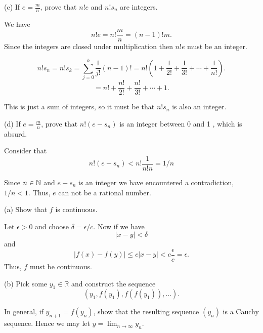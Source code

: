 \documentclass{report}
\begin{document}
\bigskip

(c) If $e=\frac{m}{n}$, prove that $n ! e$ and $n ! s_n$ are integers.

\begin{myproof}

We have $$ n!e = n!\frac{m}{n} = (n-1)!m.$$ Since the integers are closed under multiplication then $n!e$ must be an integer. 
    
\end{myproof}

\begin{myproof}

$$ n!s_n = n!s_k=\sum_{j=0}^k \frac{1}{j !}(n-1)! = n!\left(1 + \frac{1}{2!} + \frac{1}{3!}+ \cdots +\frac{1}{n!}\right) .$$
$$ = n! + \frac{n!}{2!} + \frac{n!}{3!}+ \cdots + 1 .$$

This is just a sum of integers, so it must be that $n!s_n$ is also an integer.
\end{myproof}

\bigskip
(d) If $e=\frac{m}{n}$, prove that $n!\left(e-s_n\right)$ is an integer between 0 and 1 , which is absurd.

\bigskip
\begin{myproof}

Consider that $$n!\left(e-s_n\right) < n!\frac{1}{n!n}= 1/n$$

Since $n\in\NN$ and $e-s_n$ is an integer we have encountered a contradiction, $1/n < 1.$ Thus, $e$ can not be a rational number.
    
\end{myproof}
\bigskip
\pagebreak
{}

(a) Show that $f$ is continuous.
\par
\bigskip
\begin{myproof}
    
Let $\epsilon > 0$ and choose $\delta= \epsilon/c$. Now if we have $$|x-y| < \delta$$ and $$|f(x) - f(y)| \leq c|x-y| < c \frac{\epsilon}{c} = \epsilon.$$
Thus, $f$ must be continuous.
\end{myproof}

\bigskip
\bigskip
(b) Pick some $y_1 \in \mathbb{R}$ and construct the sequence
$$
\left(y_1, f\left(y_1\right), f\left(f\left(y_1\right)\right), \ldots\right) .
$$

In general, if $y_{n+1}=f\left(y_n\right)$, show that the resulting sequence $\left(y_n\right)$ is a Cauchy sequence. Hence we may let $y=\lim _{n \rightarrow \infty} y_n$.
\end{document}
